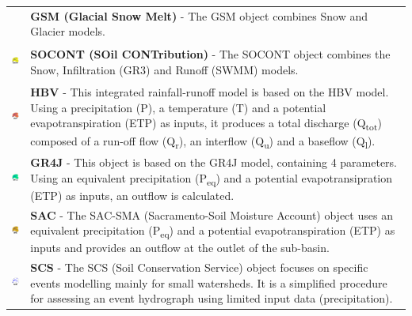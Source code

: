 \documentclass[
  letterpaper,
  DIV=11,
  numbers=noendperiod]{scrreprt}
\begin{document}
\begin{longtable}[]{@{}
  >{\raggedright\arraybackslash}p{}
  >{\raggedright\arraybackslash}p{}@{}}
& \textbf{GSM (Glacial Snow Melt)} - The GSM object combines Snow and
Glacier models. \\
\includegraphics[width=0.44in,height=0.44in]{./figures/fig-icon_object_socont.png}
& \textbf{SOCONT (SOil CONTribution)} - The SOCONT object combines the
Snow, Infiltration (GR3) and Runoff (SWMM) models. \\
\includegraphics[width=0.44in,height=0.44in]{./figures/fig-icon_object_hbv.png}
& \textbf{HBV} - This integrated rainfall-runoff model is based on the
HBV model. Using a precipitation (P), a temperature (T) and a potential
evapotranspiration (ETP) as inputs, it produces a total discharge
(Q\textsubscript{tot}) composed of a run-off flow (Q\textsubscript{r}),
an interflow (Q\textsubscript{u}) and a baseflow
(Q\textsubscript{l}). \\
\includegraphics[width=0.44in,height=0.44in]{./figures/fig-icon_object_gr4j.png}
& \textbf{GR4J} - This object is based on the GR4J model, containing 4
parameters. Using an equivalent precipitation (P\textsubscript{eq}) and
a potential evapotransipration (ETP) as inputs, an outflow is
calculated. \\
\includegraphics[width=0.44in,height=0.44in]{./figures/fig-icon_object_sac.png}
& \textbf{SAC} - The SAC-SMA (Sacramento-Soil Moisture Account) object
uses an equivalent precipitation (P\textsubscript{eq}) and a potential
evapotranspiration (ETP) as inputs and provides an outflow at the outlet
of the sub-basin. \\
\includegraphics[width=0.44in,height=0.44in]{./figures/fig-icon_object_scs.png}
& \textbf{SCS} - The SCS (Soil Conservation Service) object focuses on
specific events modelling mainly for small watersheds. It is a
simplified procedure for assessing an event hydrograph using limited
input data (precipitation). \\
\bottomrule()
\end{longtable}
\end{document}
